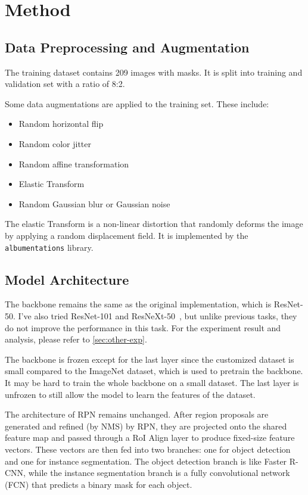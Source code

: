 \documentclass[10pt,twocolumn,letterpaper]{article}
\begin{document}

\section{Method}
\label{sec:method}

\subsection{Data Preprocessing and Augmentation}

The training dataset contains 209 images with masks. It is split into training
and validation set with a ratio of 8:2.

Some data augmentations are applied to the training set. These include:
\begin{itemize}
  \setlength\itemsep{0pt}
  \item Random horizontal flip
  \item Random color jitter
  \item Random affine transformation
  \item Elastic Transform
  \item Random Gaussian blur or Gaussian noise
\end{itemize}

The elastic Transform is a non-linear distortion that randomly deforms the image
by applying a random displacement field. It is implemented by the
\texttt{albumentations} library.

\subsection{Model Architecture}

The backbone remains the same as the original implementation, which is ResNet-50.
I've also tried ResNet-101 and ResNeXt-50~\cite{ResNeXt}, but unlike previous tasks,
they do not improve the performance in this task. For the experiment result and
analysis, please refer to \cref{sec:other-exp}.

The backbone is frozen except for the last layer since the customized dataset is
small compared to the ImageNet dataset, which is used to pretrain the backbone.
It may be hard to train the whole backbone on a small dataset. The last layer is
unfrozen to still allow the model to learn the features of the dataset.

The architecture of RPN remains unchanged. After region proposals are generated
and refined (by NMS) by RPN, they are projected onto the shared feature map
and passed through a RoI Align layer to produce fixed-size feature vectors.
These vectors are then fed into two branches: one for object detection and
one for instance segmentation. The object detection branch is like Faster R-CNN,
while the instance segmentation branch is a fully convolutional network (FCN)
that predicts a binary mask for each object.
\end{document}

